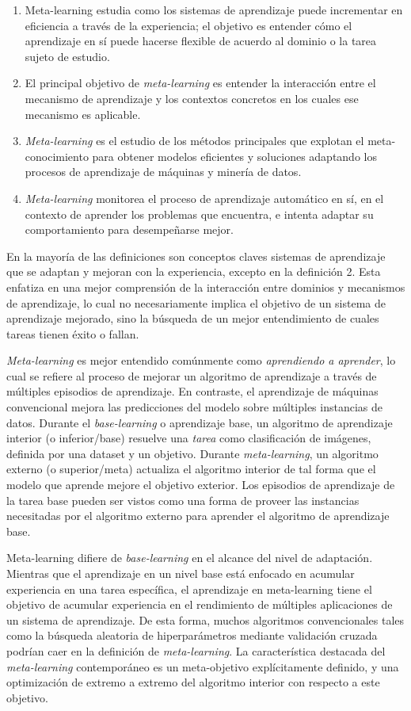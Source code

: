 \begin{enumerate}
	\item Meta-learning estudia como los sistemas de aprendizaje puede incrementar en eficiencia a través de la experiencia; el objetivo es entender cómo el aprendizaje en sí puede hacerse flexible de acuerdo al dominio o la tarea sujeto de estudio.
	\item El principal objetivo de \emph{meta-learning} es entender la interacción entre el mecanismo de aprendizaje y los contextos concretos en los cuales ese mecanismo es aplicable.
	\item \emph{Meta-learning} es el estudio de los métodos principales que explotan el meta-conocimiento para obtener modelos eficientes y soluciones adaptando los procesos de aprendizaje de máquinas y minería de datos.
	\item \emph{Meta-learning} monitorea el proceso de aprendizaje automático en sí, en el contexto de aprender los problemas que encuentra, e intenta adaptar su comportamiento para desempeñarse mejor.
\end{enumerate}

En la mayoría de las definiciones son conceptos claves sistemas de aprendizaje que se adaptan y mejoran con la experiencia, excepto en la definición 2. Esta enfatiza en una mejor comprensión de la interacción entre dominios y mecanismos de aprendizaje, lo cual no necesariamente implica el objetivo de un sistema de aprendizaje mejorado, sino la búsqueda de un mejor entendimiento de cuales tareas tienen éxito o fallan.

\emph{Meta-learning} es mejor entendido comúnmente como \textit{aprendiendo a aprender}, lo cual se refiere al proceso de mejorar un algoritmo de aprendizaje a través de múltiples episodios de aprendizaje. En contraste, el aprendizaje de máquinas convencional mejora las predicciones del modelo sobre múltiples instancias de datos. Durante el \textit{base-learning} o aprendizaje base, un algoritmo de aprendizaje interior (o inferior/base) resuelve una \textit{tarea} como clasificación de imágenes, definida por una dataset y un objetivo. Durante \emph{meta-learning}, un algoritmo externo (o superior/meta) actualiza el algoritmo interior de tal forma que el modelo que aprende mejore el objetivo exterior. Los episodios de aprendizaje de la tarea base pueden ser vistos como una forma de proveer las instancias necesitadas por el algoritmo externo para aprender el algoritmo de aprendizaje base. 

Meta-learning difiere de \textit{base-learning} en el alcance del nivel de adaptación. Mientras que el aprendizaje en un nivel base está enfocado en acumular experiencia en una tarea específica, el aprendizaje en meta-learning tiene el objetivo de acumular experiencia en el rendimiento de múltiples aplicaciones de un sistema de aprendizaje. De esta forma, muchos algoritmos convencionales tales como la búsqueda aleatoria de hiperparámetros mediante validación cruzada podrían caer en la definición de \emph{meta-learning}. La característica destacada del \emph{meta-learning} contemporáneo es un meta-objetivo explícitamente definido, y una optimización de extremo a extremo del algoritmo interior con respecto a este objetivo.

